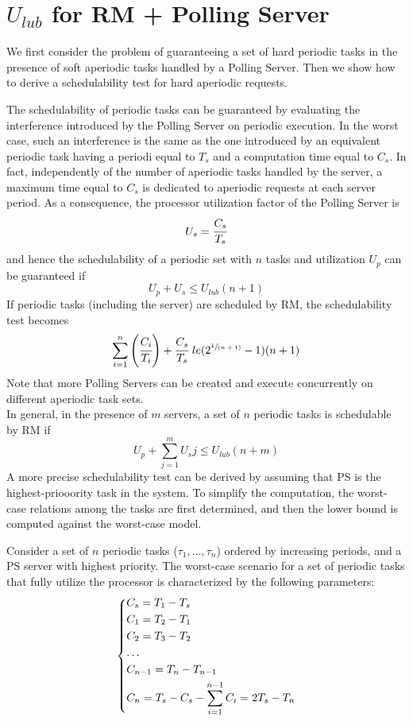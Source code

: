 \chapter{$U_{lub}$ for RM + Polling Server}
We first consider the problem of guaranteeing a set of hard periodic tasks in the presence of soft aperiodic tasks handled by a Polling Server. Then we show how to derive a schedulability test for hard aperiodic requests.

The schedulability of periodic tasks can be guaranteed by evaluating the interference introduced by the Polling Server on periodic execution. In the worst case, such an interference is the same as the one introduced by an equivalent periodic task having a periodi equal to $T_s$ and a computation time equal to $C_s$. In fact, independently of the number of aperiodic tasks handled by the server, a maximum time equal to $C_s$ is dedicated to aperiodic requests at each server period. As a consequence, the processor utilization factor of the Polling Server is
\[U_s = \cfrac{C_s}{T_s}\]
and hence the schedulability of a periodic set with $n$ tasks and utilization $U_p$ can be guaranteed if
\[U_p + U_s \le U_{lub}(n+1)\]
If periodic tasks (including the server) are scheduled by RM, the schedulability test becomes
\[\sum_{i=1}^{n} \left(\cfrac{C_i}{T_i}\right) + \cfrac{C_s}{T_s} \ le (2^{\sfrac{1}{(n+1)}}- 1)(n+1)\]
Note that more Polling Servers can be created and execute concurrently on different aperiodic task sets.\\
In general, in the presence of $m$ servers, a set of $n$ periodic tasks is schedulable by RM if
\[U_p + \sum_{j=1}^m U_sj \le U_{lub}(n+m)\]
A more precise schedulability test can be derived by assuming that PS is the highest-priooority task in the system. To simplify the computation, the worst-case relations among the tasks are first determined, and then the lower bound is computed against the worst-case model.

Consider a set of $n$ periodic tasks ($\tau_1,\dots, \tau_n$) ordered by increasing periods, and a PS server with highest priority. The worst-case scenario for a set of periodic tasks that fully utilize the processor is characterized by the following parameters:
\[
\begin{dcases}
    C_s = T_1 - T_s\\
    C_1 = T_2 - T_1\\
    C_2 = T_3 - T_2\\
    \dots\\
    C_{n-1} = T_n - T_{n-1}\\
    C_n = T_s - C_s - \sum_{i=1}^{n-1}C_i = 2T_s - T_n
\end{dcases}    
\]

